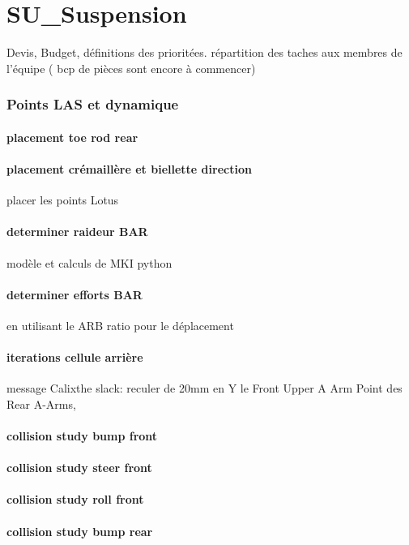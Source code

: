 \newpage 
 \section*{SU\_Suspension} 
 \par Devis, Budget, définitions des prioritées. répartition des taches aux membres de l'équipe ( bcp de pièces sont encore à commencer)
		\subsubsection*{Points LAS et dynamique} 
 \par 
			\paragraph{placement toe rod rear} 
			\paragraph{placement crémaillère et biellette direction} placer les points Lotus
			\paragraph{determiner raideur BAR} modèle et calculs de MKI python
			\paragraph{determiner efforts BAR} en utilisant le ARB ratio pour le déplacement
			\paragraph{iterations cellule arrière} message Calixthe slack: reculer de 20mm en Y le Front Upper A Arm Point  des Rear A-Arms,
			\paragraph{collision study bump front} 
			\paragraph{collision study steer front} 
			\paragraph{collision study roll front} 
			\paragraph{collision study bump rear} 
